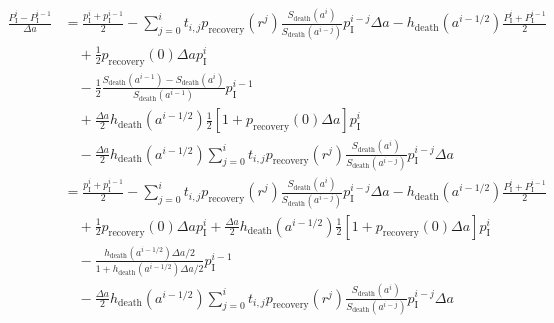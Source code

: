 \documentclass[12pt]{article}
\begin{document}
\begin{equation}
  \begin{split}
    \frac{P_{\mathrm{I}}^i - P_{\mathrm{I}}^{i - 1}}{\Delta a}
    &= \frac{p_{\mathrm{I}}^i + p_{\mathrm{I}}^{i - 1}}{2}
    - \sum_{j = 0}^i t_{i, j} p_{\text{recovery}}(r^j)
    \frac{S_{\text{death}}(a^i)}{S_{\text{death}}(a^{i - j})}
    p_{\mathrm{I}}^{i - j} \Delta a
    - h_{\text{death}}(a^{i - 1 / 2})
    \frac{P_{\mathrm{I}}^i + P_{\mathrm{I}}^{i - 1}}{2}
    \\ & \quad {}
    + \frac{1}{2} p_{\text{recovery}}(0) \Delta a p_{\mathrm{I}}^i
    \\ & \quad {}
    - \frac{1}{2}
    \frac{S_{\text{death}}(a^{i - 1}) - S_{\text{death}}(a^i)}
    {S_{\text{death}}(a^{i - 1})}
    p_{\mathrm{I}}^{i - 1}
    \\ & \quad {}
    + \frac{\Delta a}{2} h_{\text{death}}(a^{i - 1 / 2})
    \frac{1}{2} \left[1 + p_{\text{recovery}}(0) \Delta a\right]
    p_{\mathrm{I}}^i
    \\ & \quad {}
    - \frac{\Delta a}{2} h_{\text{death}}(a^{i - 1 / 2})
    \sum_{j = 0}^i t_{i, j} p_{\text{recovery}}(r^j)
    \frac{S_{\text{death}}(a^i)}{S_{\text{death}}(a^{i - j})}
    p_{\mathrm{I}}^{i - j} \Delta a
    \\
    &= \frac{p_{\mathrm{I}}^i + p_{\mathrm{I}}^{i - 1}}{2}
    - \sum_{j = 0}^i t_{i, j} p_{\text{recovery}}(r^j)
    \frac{S_{\text{death}}(a^i)}{S_{\text{death}}(a^{i - j})}
    p_{\mathrm{I}}^{i - j} \Delta a
    - h_{\text{death}}(a^{i - 1 / 2})
    \frac{P_{\mathrm{I}}^i + P_{\mathrm{I}}^{i - 1}}{2}
    \\ & \quad {}
    + \frac{1}{2} p_{\text{recovery}}(0) \Delta a p_{\mathrm{I}}^i
    + \frac{\Delta a}{2} h_{\text{death}}(a^{i - 1 / 2})
    \frac{1}{2} \left[1 + p_{\text{recovery}}(0) \Delta a\right]
    p_{\mathrm{I}}^i
    \\ & \quad {}
    - \frac{h_{\text{death}}(a^{i - 1 / 2}) \Delta a / 2}
    {1 + h_{\text{death}}(a^{i - 1 / 2}) \Delta a / 2}
    p_{\mathrm{I}}^{i - 1}
    \\ & \quad {}
    - \frac{\Delta a}{2} h_{\text{death}}(a^{i - 1 / 2})
    \sum_{j = 0}^i t_{i, j} p_{\text{recovery}}(r^j)
    \frac{S_{\text{death}}(a^i)}{S_{\text{death}}(a^{i - j})}
    p_{\mathrm{I}}^{i - j} \Delta a
  \end{split}
\end{equation}
\end{document}

